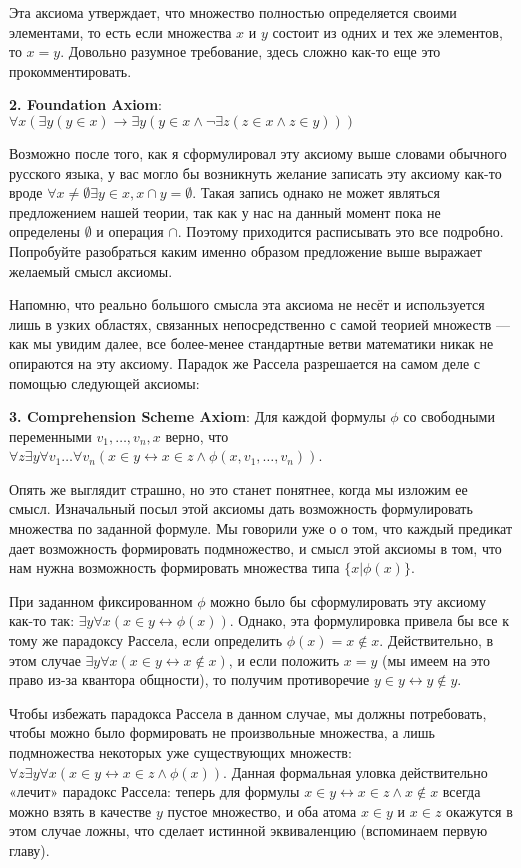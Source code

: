 Эта аксиома утверждает, что множество полностью определяется своими элементами, то есть если множества $x$ и $y$ состоит из одних и тех же элементов, то $x=y$. Довольно разумное требование, здесь сложно как-то еще это прокомментировать.

{\bfseries 2. Foundation Axiom}: $\forall x(\exists y (y\in x)\rightarrow \exists y(y\in x\wedge \neg \exists z (z\in x \wedge z\in y)))$

Возможно после того, как я сформулировал эту аксиому выше словами обычного русского языка, у вас могло бы возникнуть желание записать эту аксиому как-то вроде $\forall x \not= \emptyset \exists y\in x, x\cap y = \emptyset$. Такая запись однако не может являться предложением нашей теории, так как у нас на данный момент пока не определены $\emptyset$ и операция $\cap$. Поэтому приходится расписывать это все подробно. Попробуйте разобраться каким именно образом предложение выше выражает желаемый смысл аксиомы.

Напомню, что реально большого смысла эта аксиома не несёт и используется лишь в узких областях, связанных непосредственно с самой теорией множеств — как мы увидим далее, все более-менее стандартные ветви математики никак не опираются на эту аксиому. Парадок же Рассела разрешается на самом деле с помощью следующей аксиомы:

{\bfseries 3. Comprehension Scheme Axiom}: Для каждой формулы $\phi$ со свободными переменными $v_1, \ldots, v_n, x$ верно, что $\forall z \exists y \forall v_1 \ldots \forall v_n (x\in y \leftrightarrow x \in z \wedge \phi(x, v_1, \ldots, v_n))$.

Опять же выглядит страшно, но это станет понятнее, когда мы изложим ее смысл. Изначальный посыл этой аксиомы дать возможность формулировать множества по заданной формуле. Мы говорили уже о о том, что каждый предикат дает возможность формировать подмножество, и смысл этой аксиомы в том, что нам нужна возможность формировать множества типа $\{x|\phi(x)\}$.

При заданном фиксированном $\phi$ можно было бы сформулировать эту аксиому как-то так: $\exists y \forall x (x\in y \leftrightarrow \phi(x))$. Однако, эта формулировка привела бы все к тому же парадоксу Рассела, если определить $\phi(x) = x \not \in x$. Действительно, в этом случае $\exists y \forall x (x\in y \leftrightarrow x\not \in x)$, и если положить $x=y$ (мы имеем на это право из-за квантора общности), то получим противоречие $y \in y \leftrightarrow y\not \in y$.

Чтобы избежать парадокса Рассела в данном случае, мы должны потребовать, чтобы можно было формировать не произвольные множества, а лишь подмножества некоторых уже существующих множеств: $\forall z \exists y \forall x (x\in y \leftrightarrow x \in z \wedge \phi(x))$. Данная формальная уловка действительно «лечит» парадокс Рассела: теперь для формулы $x \in y \leftrightarrow x \in z \wedge x\not \in x$ всегда можно взять в качестве $y$ пустое множество, и оба атома $x \in y$ и $x \in z$ окажутся в этом случае ложны, что сделает истинной эквиваленцию (вспоминаем первую главу).

